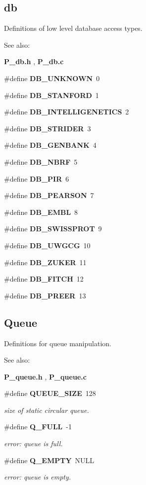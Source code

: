 \subsection*{db}
Definitions of low level database access types.

\begin{Desc}
\item[See also: ]\par
{\bf P\_\-db.h} , {\bf P\_\-db.c}\end{Desc}
\begin{CompactItemize}
\item 
\#define {\bf DB\_\-UNKNOWN}\ 0
\item 
\#define {\bf DB\_\-STANFORD}\ 1
\item 
\#define {\bf DB\_\-INTELLIGENETICS}\ 2
\item 
\#define {\bf DB\_\-STRIDER}\ 3
\item 
\#define {\bf DB\_\-GENBANK}\ 4
\item 
\#define {\bf DB\_\-NBRF}\ 5
\item 
\#define {\bf DB\_\-PIR}\ 6
\item 
\#define {\bf DB\_\-PEARSON}\ 7
\item 
\#define {\bf DB\_\-EMBL}\ 8
\item 
\#define {\bf DB\_\-SWISSPROT}\ 9
\item 
\#define {\bf DB\_\-UWGCG}\ 10
\item 
\#define {\bf DB\_\-ZUKER}\ 11
\item 
\#define {\bf DB\_\-FITCH}\ 12
\item 
\#define {\bf DB\_\-PREER}\ 13
\end{CompactItemize}
\subsection*{Queue}
Definitions for queue manipulation.

\begin{Desc}
\item[See also: ]\par
{\bf P\_\-queue.h} , {\bf P\_\-queue.c}\end{Desc}
\begin{CompactItemize}
\item 
\#define {\bf QUEUE\_\-SIZE}\ 128
\begin{CompactList}\small\item\em size of static circular queue.\item\end{CompactList}\item 
\#define {\bf Q\_\-FULL}\ -1
\begin{CompactList}\small\item\em error: queue is full.\item\end{CompactList}\item 
\#define {\bf Q\_\-EMPTY}\ NULL
\begin{CompactList}\small\item\em error: queue is empty.\item\end{CompactList}\end{CompactItemize}
